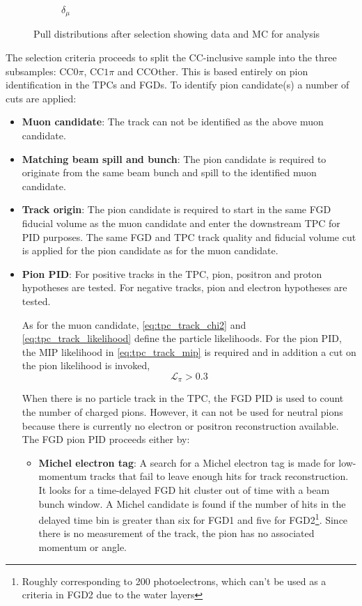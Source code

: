 \begin{figure}[h]
\begin{subfigure}[t]{0.32\textwidth}
		\caption{$\delta_\mu$}
	\end{subfigure}
	\caption{Pull distributions after selection showing data and MC for \numu analysis}
	\label{fig:numu_pulls}
\end{figure}

The selection criteria proceeds to split the CC-inclusive sample into the three subsamples: CC$0\pi$, CC$1\pi$ and CCOther. This is based entirely on pion identification in the TPCs and FGDs. To identify pion candidate(s) a number of cuts are applied:
\begin{itemize}
	\item \textbf{Muon candidate}: The track can not be identified as the above muon candidate.
	
	\item \textbf{Matching beam spill and bunch}: The pion candidate is required to originate from the same beam bunch and spill to the identified muon candidate.
	
	\item \textbf{Track origin}: The pion candidate is required to start in the same FGD fiducial volume as the muon candidate and enter the downstream TPC for PID purposes. The same FGD and TPC track quality and fiducial volume cut is applied for the pion candidate as for the muon candidate.
	
	\item \textbf{Pion PID}: For positive tracks in the TPC, pion, positron and proton hypotheses are tested. For negative tracks, pion and electron hypotheses are tested. 
	
	As for the muon candidate, \autoref{eq:tpc_track_chi2} and \autoref{eq:tpc_track_likelihood} define the particle likelihoods. For the pion PID, the MIP likelihood in \autoref{eq:tpc_track_mip} is required and in addition a cut on the pion likelihood is invoked,
	\begin{equation}
	\label{tpc_track_pi}
		\mathcal{L}_\pi > 0.3
	\end{equation}
	
	When there is no particle track in the TPC, the FGD PID is used to count the number of charged pions. However, it can not be used for neutral pions because there is currently no electron or positron reconstruction available. The FGD pion PID proceeds either by:
	\begin{itemize}
		\item \textbf{Michel electron tag}: A search for a Michel electron tag is made for low-momentum tracks that fail to leave enough hits for track reconstruction. It looks for a time-delayed FGD hit cluster out of time with a beam bunch window. A Michel candidate is found if the number of hits in the delayed time bin is greater than six for FGD1 and five for FGD2\footnote{Roughly corresponding to 200 photoelectrons, which can't be used as a criteria in FGD2 due to the water layers}. Since there is no measurement of the track, the pion has no associated momentum or angle.
		

\end{itemize}
\end{itemize}
